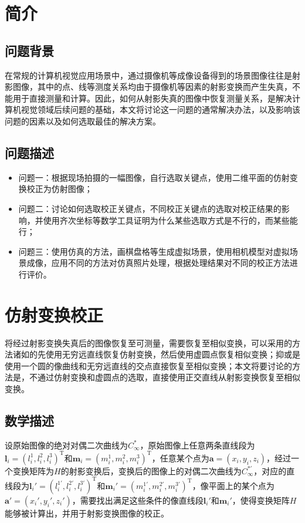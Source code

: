 \documentclass[11pt]{article}
\begin{document}
\newpage

\setcounter{tocdepth}{3}
\tableofcontents
\newpage

\setcounter{page}{1}
\section{简介}
\subsection{问题背景}
在常规的计算机视觉应用场景中，通过摄像机等成像设备得到的场景图像往往是射影图像，其中的点、线等测度关系均由于摄像机等因素的射影变换而产生失真，不能用于直接测量和计算。因此，如何从射影失真的图像中恢复测量关系，是解决计算机视觉领域后续问题的基础，本文将讨论这一问题的通常解决办法，以及影响该问题的因素以及如何选取最佳的解决方案。
\subsection{问题描述}
\begin{itemize}
  \item 问题一：根据现场拍摄的一幅图像，自行选取关键点，使用二维平面的仿射变换校正为仿射图像；
  \item 问题二：讨论如何选取校正关键点，不同校正关键点的选取对校正结果的影响，并使用齐次坐标等数学工具证明为什么某些选取方式是不行的，而某些能行；
  \item 问题三：使用仿真的方法，画棋盘格等生成虚拟场景，使用相机模型对虚拟场景成像，应用不同的方法对仿真照片处理，根据处理结果对不同的校正方法进行评价。
\end{itemize}

\section{仿射变换校正}
将经过射影变换失真后的图像恢复至可测量，需要恢复至相似变换，可以采用的方法诸如的先使用无穷远直线恢复仿射变换，然后使用虚圆点恢复相似变换；抑或是使用一个圆的像曲线和无穷远直线的交点直接恢复至相似变换；本文将要讨论的方法是，不通过仿射变换和虚圆点的选取，直接使用正交直线从射影变换恢复至相似变换。
\subsection{数学描述}
设原始图像的绝对对偶二次曲线为$C_\infty^*$，原始图像上任意两条直线段为$\mathbf{l}_i=(l_i^1,l_i^2,l_i^3)^\textrm{T}$和$\mathbf{m}_i=(m_i^1,m_i^2,m_i^3)^\textrm{T}$，任意某个点为$\mathbf{a}=(x_i,y_i,z_i)$，经过一个变换矩阵为$H$的射影变换后，变换后的图像上的对偶二次曲线为$C_\infty^{*'}$，对应的直线段为$\mathbf{l}_i'=(l_i^{1'},l_i^{2'},l_i^{3'})^\textrm{T}$和$\mathbf{m}_i'=(m_i^{1'},m_i^{2'},m_i^{3'})^\textrm{T}$，像平面上的某个点为$\mathbf{a}'=(x_i',y_i',z_i')$，需要找出满足这些条件的像直线段$\mathbf{l}_i'$和$\mathbf{m}_i'$，使得变换矩阵$H$能够被计算出，并用于射影变换图像的校正。
\end{document}
